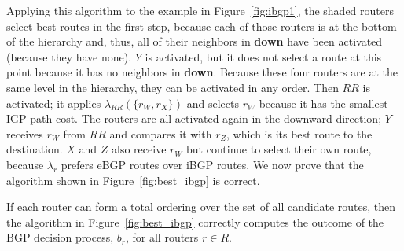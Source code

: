 Applying this algorithm to the example in Figure~\ref{fig:ibgp1}, the
shaded routers select best routes in the first step, because each of those
routers is at the bottom of the hierarchy and, thus, all of their
neighbors in {\bf down} have been activated (because they have none). $Y$
is activated, but it does not select a route at this point because it 
has no neighbors in {\bf down}. 
Because these four routers are at the same level in the hierarchy,
they can be activated in any order.
%
Then $RR$ is activated; it applies $\lambda_{RR}(\{r_W,r_X\})$ and
selects $r_W$ because it has the smallest IGP path cost.  The routers
are all activated again in the downward direction; $Y$ receives $r_W$
from $RR$ and compares it with $r_Z$, which is its best route to the
destination.  $X$ and $Z$ also receive $r_W$ but continue to select
their own route, because $\lambda_r$ prefers eBGP routes over iBGP routes.
We now prove that the algorithm shown in Figure~\ref{fig:best_ibgp} is
correct. 

\begin{theorem}\label{t:exit}
If each router can form a total ordering over the set of all candidate
routes, then the algorithm in Figure~\ref{fig:best_ibgp} correctly
computes the outcome of the BGP decision process, $b_r$, for all routers
$r \in R$.
\end{theorem}
\vspace*{0.1in}

